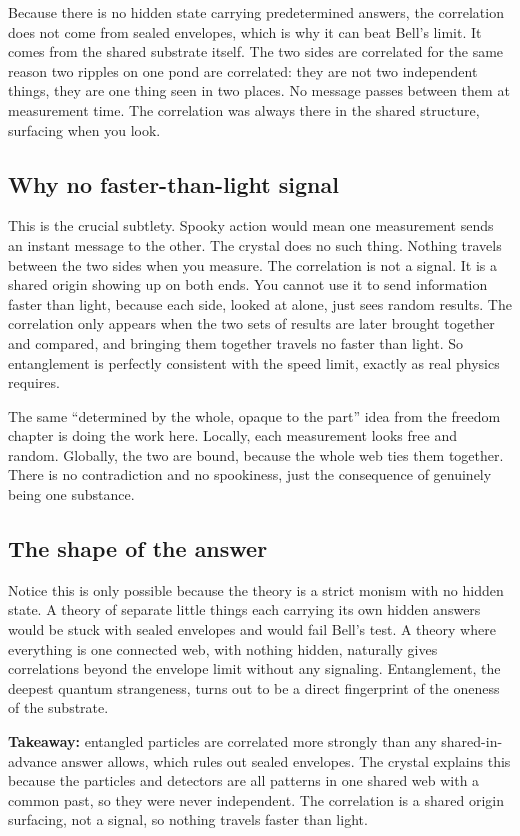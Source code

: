 Because there is no hidden state carrying predetermined answers, the correlation does not come from sealed envelopes, which is why it can beat Bell's limit. It comes from the shared substrate itself. The two sides are correlated for the same reason two ripples on one pond are correlated: they are not two independent things, they are one thing seen in two places. No message passes between them at measurement time. The correlation was always there in the shared structure, surfacing when you look.

\subsection{Why no faster-than-light signal}

This is the crucial subtlety. Spooky action would mean one measurement sends an instant message to the other. The crystal does no such thing. Nothing travels between the two sides when you measure. The correlation is not a signal. It is a shared origin showing up on both ends. You cannot use it to send information faster than light, because each side, looked at alone, just sees random results. The correlation only appears when the two sets of results are later brought together and compared, and bringing them together travels no faster than light. So entanglement is perfectly consistent with the speed limit, exactly as real physics requires.

The same ``determined by the whole, opaque to the part'' idea from the freedom chapter is doing the work here. Locally, each measurement looks free and random. Globally, the two are bound, because the whole web ties them together. There is no contradiction and no spookiness, just the consequence of genuinely being one substance.

\subsection{The shape of the answer}

Notice this is only possible because the theory is a strict monism with no hidden state. A theory of separate little things each carrying its own hidden answers would be stuck with sealed envelopes and would fail Bell's test. A theory where everything is one connected web, with nothing hidden, naturally gives correlations beyond the envelope limit without any signaling. Entanglement, the deepest quantum strangeness, turns out to be a direct fingerprint of the oneness of the substrate.

\textbf{Takeaway:} entangled particles are correlated more strongly than any shared-in-advance answer allows, which rules out sealed envelopes. The crystal explains this because the particles and detectors are all patterns in one shared web with a common past, so they were never independent. The correlation is a shared origin surfacing, not a signal, so nothing travels faster than light.
